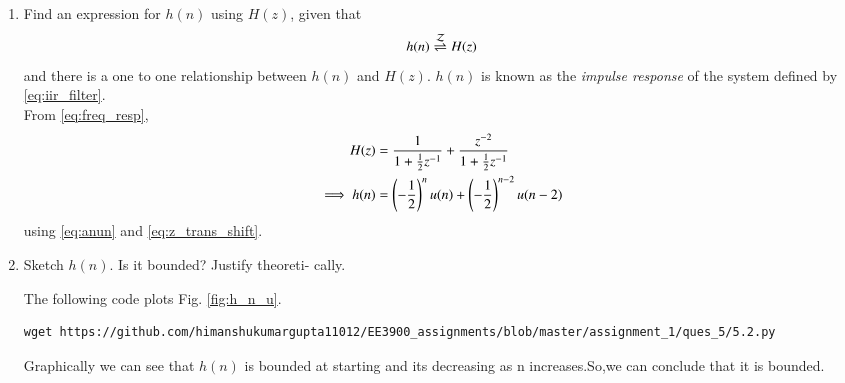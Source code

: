 \documentclass[journal,12pt,twocolumn]{IEEEtran}
\renewcommand\thesection{\arabic{section}}
\begin{document}
\begin{enumerate}[label=\thesection.\arabic*]
\item \label{prob:impulse_resp}
Find an expression for $h(n)$ using $H(z)$, given that 
\begin{equation}
\label{eq:impulse_resp}
h(n) \overset{\mathcal{Z}}{ \rightleftharpoons} H(z)
\end{equation}
and there is a one to one relationship between $h(n)$ and $H(z)$. $h(n)$ is known as the {\em impulse response} of the
system defined by \eqref{eq:iir_filter}.
\\
\solution From \eqref{eq:freq_resp},
\begin{align}
H(z) &= \frac{1}{1 + \frac{1}{2}z^{-1}} + \frac{ z^{-2}}{1 + \frac{1}{2}z^{-1}}
\\
\implies h(n) &= \left(-\frac{1}{2}\right)^{n}u(n) + \left(-\frac{1}{2}\right)^{n-2}u(n-2)
\end{align}
using \eqref{eq:anun} and \eqref{eq:z_trans_shift}.
\item Sketch $h(n)$. Is it bounded? Justify theoreti-
cally.

\solution The following code plots Fig. \ref{fig:h_n_u}.

\begin{lstlisting}
wget https://github.com/himanshukumargupta11012/EE3900_assignments/blob/master/assignment_1/ques_5/5.2.py
\end{lstlisting}
Graphically we can see that $h(n)$ is bounded at starting and its decreasing as n increases.So,we can conclude that it is bounded.


\end{enumerate}
\end{document}
